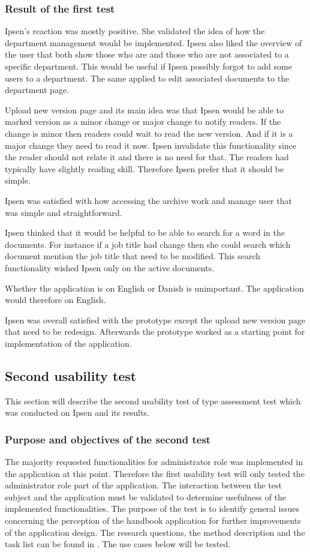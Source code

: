 \subsubsection*{Result of the first test}
Ipsen's reaction was mostly positive. 
She validated the idea of how the department management would be implemented. 
Ipsen also liked the overview of the user that both show those who are and those who are not associated to a specific department.
This would be useful if Ipsen possibly forgot to add some users to a department. 
The same applied to edit associated documents to the department page. 

Upload new version page and its main idea was that Ipsen would be able to marked version as a minor change or major change to notify readers. 
If the change is minor then readers could wait to read the new version.
And if it is a major change they need to read it now. 
Ipsen invalidate this functionality since the reader should not relate it and there is no need for that. 
The readers had typically have slightly reading skill. 
Therefore Ipsen prefer that it should be simple. 

Ipsen was satisfied with how accessing the archive work and manage user that was simple and straightforward. 

Ipsen thinked that it would be helpful to be able to search for a word in the documents.
For instance if a job title had change then she could search which document mention the job title that need to be modified.
This search functionality wished Ipsen only on the active documents. 

Whether the application is on English or Danish is unimportant. 
The application would therefore on English. 

Ipsen was overall satisfied with the prototype except the upload new version page that need to be redesign. 
Afterwards the prototype worked as a starting point for implementation of the application. 

\subsection{Second usability test}\label{secondtest}
This section will describe the second usability test	of type assessment test which was conducted on Ipsen and its results.

\subsubsection*{Purpose and objectives of the second test}
The majority requested functionalities for administrator role was implemented in the application at this point. 
Therefore the first usability test will only tested the administrator role part of the application.
The interaction between the test subject and the application must be validated to determine usefulness of the implemented functionalities. 
The purpose of the test is to identify general issues concerning the perception of the handbook application for further improvements of the application design.
The research questions, the method description and the task list can be found in .
The use cases below will be tested.

